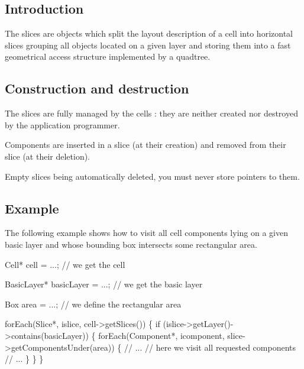 \hypertarget{classHurricane_1_1Slice_secSliceIntro}{}\subsection{Introduction}\label{classHurricane_1_1Slice_secSliceIntro}
The slices are objects which split the layout description of a cell into horizontal slices grouping all objects located on a given layer and storing them into a fast geometrical access structure implemented by a quadtree.\hypertarget{classHurricane_1_1Slice_secSliceConstructionAndDestruction}{}\subsection{Construction and destruction}\label{classHurricane_1_1Slice_secSliceConstructionAndDestruction}
The slices are fully managed by the cells \-: they are neither created nor destroyed by the application programmer.

Components are inserted in a slice (at their creation) and removed from their slice (at their deletion).

Empty slices being automatically deleted, you must never store pointers to them.\hypertarget{classHurricane_1_1Slice_secSliceExample}{}\subsection{Example}\label{classHurricane_1_1Slice_secSliceExample}
The following example shows how to visit all cell components lying on a given basic layer and whose bounding box intersects some rectangular area. 
\begin{DoxyCode}
Cell* cell = ...; \textcolor{comment}{// we get the cell}
 
BasicLayer* basicLayer = ...; \textcolor{comment}{// we get the basic layer}
 
Box area = ...; \textcolor{comment}{// we define the rectangular area}
 
forEach(Slice*, islice, cell->getSlices()) \{
  \textcolor{keywordflow}{if} (islice->getLayer()->contains(basicLayer)) \{
    forEach(Component*, icomponent, slice->getComponentsUnder(area)) \{
      \textcolor{comment}{// ...}
      \textcolor{comment}{// here we visit all requested components}
      \textcolor{comment}{// ...}
    \}
  \}
\}
\end{DoxyCode}
 

